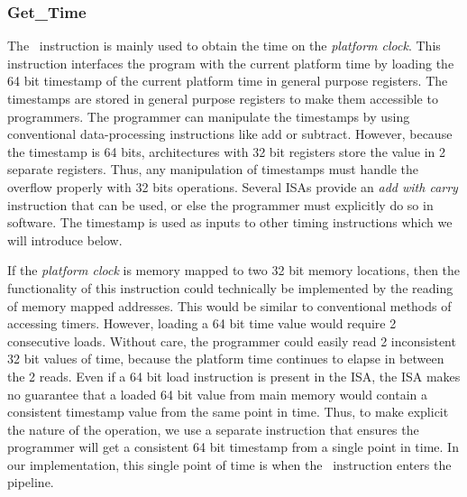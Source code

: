 \subsubsection{Get\_Time}
The \gettime\ instruction is mainly used to obtain the time on the \emph{platform clock}.
This instruction interfaces the program with the current platform time by loading the 64 bit timestamp of the current platform time in general purpose registers. 
The timestamps are stored in general purpose registers to make them accessible to programmers. 
The programmer can manipulate the timestamps by using conventional data-processing instructions like add or subtract.
However, because the timestamp is 64 bits, architectures with 32 bit registers store the value in 2 separate registers. 
Thus, any manipulation of timestamps must handle the overflow properly with 32 bits operations. 
Several ISAs provide an \emph{add with carry} instruction that can be used, or else the programmer must explicitly do so in software.
The timestamp is used as inputs to other timing instructions which we will introduce below.   

If the \emph{platform clock} is memory mapped to two 32 bit memory locations, then the functionality of this instruction could technically be implemented by the reading of memory mapped addresses. 
This would be similar to conventional methods of accessing timers. 
However, loading a 64 bit time value would require 2 consecutive loads.
Without care, the programmer could easily read 2 inconsistent 32 bit values of time, because the platform time continues to elapse in between the 2 reads.     
Even if a 64 bit load instruction is present in the ISA, the ISA makes no guarantee that a loaded 64 bit value from main memory would contain a consistent timestamp value from the same point in time. 
Thus, to make explicit the nature of the operation, we use a separate instruction that ensures the programmer will get a consistent 64 bit timestamp from a single point in time.    
In our implementation, this single point of time is when the \gettime\ instruction enters the pipeline.

